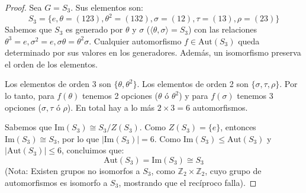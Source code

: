\begin{proof}
    Sea $G = S_3$. Sus elementos son:
    \begin{equation*}
        S_3 = \{e, \theta=(123), \theta^2=(132), \sigma=(12), \tau=(13), \rho=(23) \}
    \end{equation*}
    Sabemos que $S_3$ es generado por $\theta$ y $\sigma$ ($\langle \theta, \sigma \rangle = S_3$) con las relaciones $\theta^3 = e, \sigma^2 = e, \sigma\theta = \theta^2\sigma$.
    Cualquier automorfismo $f \in \text{Aut}(S_3)$ queda determinado por sus valores en los generadores. Además, un isomorfismo preserva el orden de los elementos.
    
    Los elementos de orden 3 son $\{\theta, \theta^2\}$. Los elementos de orden 2 son $\{\sigma, \tau, \rho\}$.
    Por lo tanto, para $f(\theta)$ tenemos 2 opciones ($\theta$ ó $\theta^2$) y para $f(\sigma)$ tenemos 3 opciones ($\sigma, \tau$ ó $\rho$).
    En total hay a lo más $2 \times 3 = 6$ automorfismos.
    
    Sabemos que $\text{Im}(S_3) \cong S_3/Z(S_3)$. Como $Z(S_3) = \{e\}$, entonces $\text{Im}(S_3) \cong S_3$, por lo que $|\text{Im}(S_3)| = 6$.
    Como $\text{Im}(S_3) \le \text{Aut}(S_3)$ y $|\text{Aut}(S_3)| \le 6$, concluimos que:
    \begin{equation*}
        \text{Aut}(S_3) = \text{Im}(S_3) \cong S_3
    \end{equation*}
    (Nota: Existen grupos no isomorfos a $S_3$, como $\mathbb{Z}_2 \times \mathbb{Z}_2$, cuyo grupo de automorfismos es isomorfo a $S_3$, mostrando que el recíproco falla).
\end{proof}


